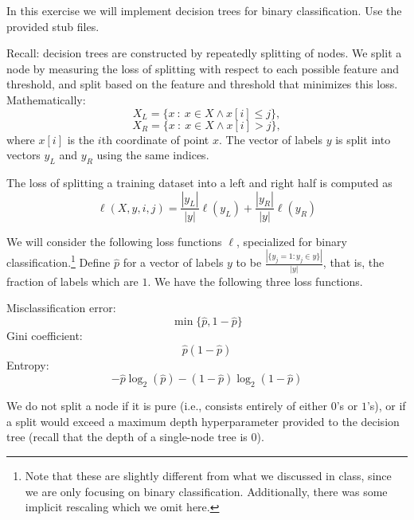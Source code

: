 \documentclass[10pt,letter,notitlepage]{article}
\newcounter{exercise}
\begin{document}
\begin{exercise}
  In this exercise we will implement decision trees for binary classification.
  Use the provided stub files.

  Recall: decision trees are constructed by repeatedly splitting of nodes.
  We split a node by measuring the loss of splitting with respect to each possible feature and threshold, and split based on the feature and threshold that minimizes this loss.
  Mathematically:
  \[X_L = \{x\ :\ x \in X \wedge  x[i] \leq j\},\]
  \[X_R = \{x\ :\ x \in X \wedge  x[i] > j\},\]
  where $x[i]$ is the $i$th coordinate of point $x$.
  The vector of labels $y$ is split into vectors $y_L$ and $y_R$ using the same indices.

  The loss of splitting a training dataset into a left and right half is computed as
  \[\ell(X,y,i,j) = \frac{|y_L|}{|y|}\ell(y_L) + \frac{|y_R|}{|y|}\ell(y_R) \]

  We will consider the following loss functions $\ell$, specialized for binary classification.\footnote{Note that these are slightly different from what we discussed in class, since we are only focusing on binary classification. Additionally, there was some implicit rescaling which we omit here.}
  Define $\hat p$ for a vector of labels $y$ to be $\frac{|\{y_j = 1 : y_j \in y\}|}{|y|}$, that is, the fraction of labels which are $1$.
  We have the following three loss functions.

  \noindent Misclassification error:
  \[\min \{\hat p, 1-\hat p\}\]
  Gini coefficient:
  \[\hat p (1 - \hat p)\]
  Entropy:
  \[- \hat p \log_2 (\hat p) - (1 - \hat p) \log_2 (1 - \hat p ) \]

  We do not split a node if it is pure (i.e., consists entirely of either $0$'s or $1$'s), or if a split would exceed a maximum depth hyperparameter provided to the decision tree (recall that the depth of a single-node tree is $0$).




\end{exercise}
\end{document}
